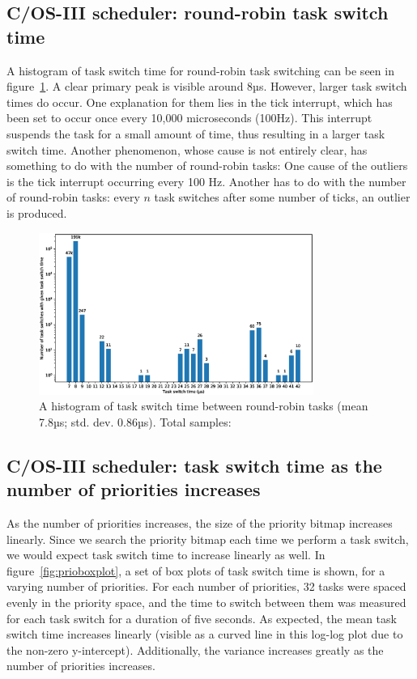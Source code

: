 \documentclass[twoside]{uva-inf-bachelor-thesis}
\newcommand{\ucosiii}{\textmu C/OS-III\xspace}
\begin{document}
\subsection{\ucosiii scheduler: round-robin task switch time}
A histogram of task switch time for round-robin task switching can be seen in figure~\ref{fig:rrhist}. A clear primary peak is visible around 8µs. However, larger task switch times do occur. One explanation for them lies in the tick interrupt, which has been set to occur once every 10,000 microseconds (100Hz). This interrupt suspends the task for a small amount of time, thus resulting in a larger task switch time. Another phenomenon, whose cause is not entirely clear, has something to do with the number of round-robin tasks:  One cause of the outliers is the tick interrupt occurring every 100 Hz. Another has to do with the number of round-robin tasks: every $n$ task switches after some number of ticks, an outlier is produced.

\begin{figure}[htpb]
    \centering
    \includegraphics[width=0.8\textwidth]{task_switch_time.eps}
    \caption{A histogram of task switch time between round-robin tasks (mean 7.8µs; std. dev. 0.86µs). Total samples:  }
    \label{fig:rrhist}
\end{figure}

\subsection{\ucosiii scheduler: task switch time as the number of priorities increases}

As the number of priorities increases, the size of the priority bitmap increases linearly. Since we search the priority bitmap each time we perform a task switch, we would expect task switch time to increase linearly as well. In figure~\ref{fig:prioboxplot}, a set of box plots of task switch time is shown, for a varying number of priorities. For each number of priorities, 32 tasks were spaced evenly in the priority space, and the time to switch between them was measured for each task switch for a duration of five seconds. As expected, the mean task switch time increases linearly (visible as a curved line in this log-log plot due to the non-zero y-intercept). Additionally, the variance increases greatly as the number of priorities increases.
\end{document}
